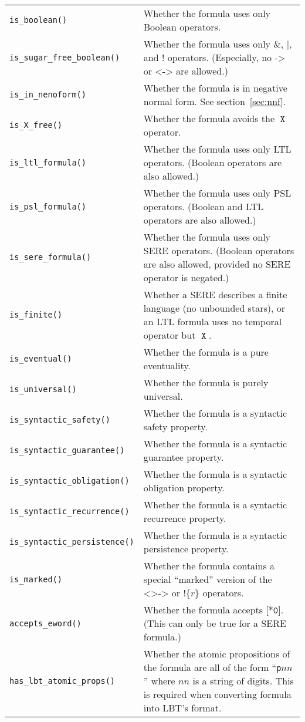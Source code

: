 \documentclass[a4paper,twoside,10pt,DIV=12]{scrreprt}
\newcommand{\newfootnotemark}[1]{\addtocounter{footnote}{#1}\footnotemark[\value{footnote}]}
\DeclareMathOperator{\X}{\texttt{X}}
\DeclareMathOperator{\NOT}{\texttt{!}}
\newcommand{\IMPLIES}{\mathbin{\texttt{->}}}
\newcommand{\EQUIV}{\mathbin{\texttt{<->}}}
\newcommand{\OR}{\mathbin{\texttt{|}}}
\newcommand{\AND}{\mathbin{\texttt{\&}}}
\newcommand{\0}{\texttt{0}}
\newcommand{\1}{\texttt{1}}
\newcommand{\eword}{\texttt{[*0]}}
\newcommand{\Esuffix}{\texttt{<>->}}
\newcommand{\nsere}[1]{\texttt{!\{}#1\texttt{\}}}
\begin{document}
\noindent
\label{property-methods}
\begin{tabulary}{.995\textwidth}{@{}lJ@{}}
\texttt{is\_boolean()}& Whether the formula uses only Boolean
  operators.
\\\texttt{is\_sugar\_free\_boolean()}& Whether the formula uses
  only $\AND$, $\OR$, and $\NOT$ operators.  (Especially, no
  $\IMPLIES$ or $\EQUIV$ are allowed.)
\\\texttt{is\_in\_nenoform()}& Whether the formula is in negative
  normal form. See section~\ref{sec:nnf}.
\\\texttt{is\_X\_free()}&
  Whether the formula avoids the $\X$ operator.
\\\texttt{is\_ltl\_formula()}& Whether the formula uses only LTL
  operators. (Boolean operators are also allowed.)
\\\texttt{is\_psl\_formula()}& Whether the formula uses only PSL
  operators. (Boolean and LTL operators are also allowed.)
\\\texttt{is\_sere\_formula()}& Whether the formula uses only
  SERE operators. (Boolean operators are also allowed, provided
  no SERE operator is negated.)
\\\texttt{is\_finite()}& Whether a SERE describes a finite
  language (no unbounded stars), or an LTL formula uses no
  temporal operator but $\X$.
\\\texttt{is\_eventual()}& Whether the formula is a pure eventuality.
\\\texttt{is\_universal()}& Whether the formula is purely universal.
\\\texttt{is\_syntactic\_safety()}& Whether the formula is a syntactic
  safety property.
\\\texttt{is\_syntactic\_guarantee()}& Whether the formula is a syntactic
  guarantee property.
\\\texttt{is\_syntactic\_obligation()}& Whether the formula is a syntactic
  obligation property.
\\\texttt{is\_syntactic\_recurrence()}& Whether the formula is a syntactic
  recurrence property.
\\\texttt{is\_syntactic\_persistence()}& Whether the formula is a syntactic
  persistence property.
\\\texttt{is\_marked()}& Whether the formula contains a special
  ``marked'' version of the $\Esuffix$ or $\nsere{r}$ operators.\newfootnotemark{1}
\\\texttt{accepts\_eword()}& Whether the formula accepts
  $\eword$. (This can only be true for a SERE formula.)
\\\texttt{has\_lbt\_atomic\_props()}& Whether the atomic
  propositions of the formula are all of the form ``\texttt{p}$nn$''
  where $nn$ is a string of digits.  This is required when converting
  formula into LBT's format.\newfootnotemark{1}
\end{tabulary}
\end{document}
